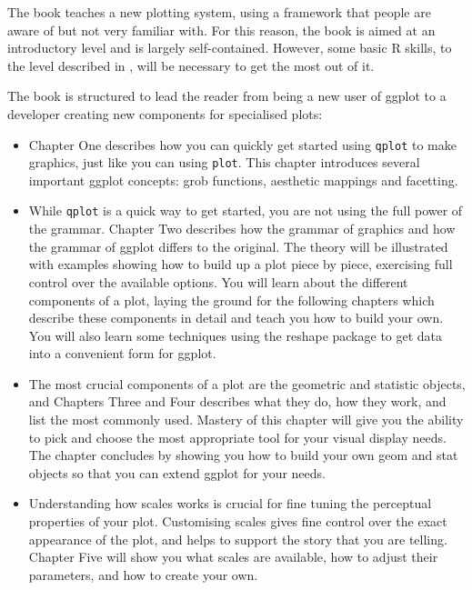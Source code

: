 \documentclass[oneside,letterpaper]{scrartcl}
\begin{document}
The book teaches a new plotting system, using a framework that people are aware of but not very familiar with.  For this reason, the book is aimed at an introductory level and is largely self-contained.  However, some basic R skills, to the level described in \citet{dalgaard:2002}, will be necessary to get the most out of it.

The book is structured to lead the reader from being a new user of ggplot to a developer creating new components for specialised plots:

\begin{itemize}
	\item Chapter One describes how you can quickly get started using {\tt qplot} to make graphics, just like you can using {\tt plot}.  This chapter introduces several important ggplot concepts: grob functions, aesthetic mappings and facetting.
	
	\item While {\tt qplot} is a quick way to get started, you are not using the full power of the grammar.  Chapter Two describes how the grammar of graphics and how the grammar of ggplot differs to the original.  The theory will be illustrated with examples showing how to build up a plot piece by piece, exercising full control over the available options.  You will learn about the different components of a plot, laying the ground for the following chapters which describe these components in detail and teach you how to build your own.  You will also learn some techniques using the reshape package to get data into a convenient form for ggplot.

	\item The most crucial components of a plot are the geometric and statistic objects, and Chapters Three and Four describes what they do, how they work, and list the most commonly used.  Mastery of this chapter will give you the ability to pick and choose the most appropriate tool for your visual display needs.  The chapter concludes by showing you how to build your own geom and stat objects so that you can extend ggplot for your needs.

	\item Understanding how scales works is crucial for fine tuning the perceptual properties of your plot.  Customising scales gives fine control over the exact appearance of the plot, and helps to support the story that you are telling.  Chapter Five will show you what scales are available, how to adjust their parameters, and how to create your own.


\end{itemize}
\end{document}
